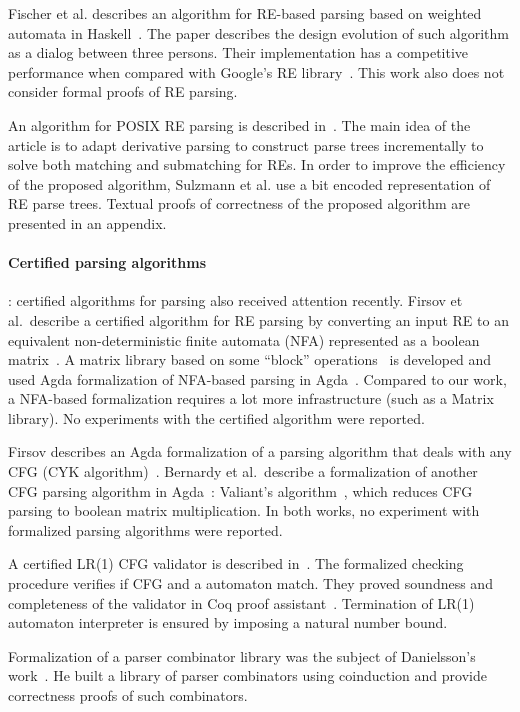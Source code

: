 \documentclass[review]{elsarticle}
\begin{document}
Fischer et al. describes an algorithm for RE-based parsing based on
weighted automata in Haskell~\cite{Fischer2010}.  The paper describes
the design evolution of such algorithm as a dialog between three
persons. Their implementation has a competitive performance when
compared with Google's RE library~\cite{re2}. This work also does not
consider formal proofs of RE parsing.

An algorithm for POSIX RE parsing is described
in~\cite{SulzmannL14}. The main idea of the article is to adapt
derivative parsing to construct parse trees incrementally to solve
both matching and submatching for REs. In order to improve the
efficiency of the proposed algorithm, Sulzmann et al. use a bit
encoded representation of RE parse trees. Textual proofs of
correctness of the proposed algorithm are presented in an appendix.

\paragraph{Certified parsing algorithms}: certified algorithms for
parsing also received attention recently. Firsov et al.~describe a
certified algorithm for RE parsing by converting an input RE to an
equivalent non-deterministic finite automata (NFA) represented as a
boolean matrix~\cite{FirsovU13}. A matrix library based on some
``block'' operations~\cite{MacedoO13} is developed and used Agda
formalization of NFA-based parsing in Agda~\cite{Norell2009}. Compared
to our work, a NFA-based formalization requires a lot more
infrastructure (such as a Matrix library). No experiments with the
certified algorithm were reported.

Firsov describes an Agda formalization of a parsing algorithm that
deals with any CFG (CYK algorithm)~\cite{Firsov2014}. Bernardy
et al.~describe a formalization of another CFG parsing algorithm in
Agda~\cite{BernardyJ16}: Valiant's algorithm~\cite{Valiant1975}, which
reduces CFG parsing to boolean matrix multiplication. In both works,
no experiment with formalized parsing algorithms were reported.

A certified LR(1) CFG validator is described
in~\cite{Jourdan2012}. The formalized checking procedure
verifies if CFG and a automaton match. They proved soundness and
completeness of the validator in Coq proof
assistant~\cite{Bertot2010}. Termination of LR(1) automaton
interpreter is ensured by imposing a natural number bound.

Formalization of a parser combinator library was the subject of
Danielsson's work~\cite{Danielsson2010}. He built a library of parser
combinators using coinduction and provide correctness proofs of such
combinators.
\end{document}
